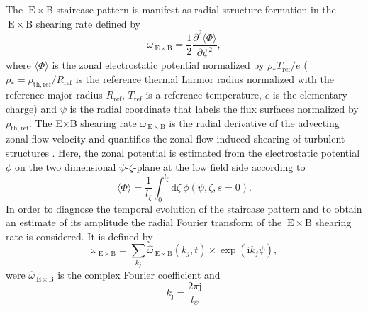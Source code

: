 \documentclass[aip, amsmath, amssymb, reprint, twocolumn]{revtex4-1}
\begin{document}
The ${\mathrm{\:E}\times\mathrm{B}}$ staircase pattern is manifest as radial structure formation in the ${\mathrm{\:E}\times\mathrm{B}}$ shearing rate defined by\cite{rath2016, doi:10.1063/1.3005380, rath2016, peeters2016}
\begin{equation}
	\omega_{\mathrm{\:E \times B}} = \frac{1}{2} \frac{\partial^2 \langle \Phi \rangle}{\partial \psi^2},
	\label{eq:shearingrate}
\end{equation}
where $\langle \Phi \rangle$ is the zonal electrostatic potential normalized by $\rho_\ast T_\mathrm{ref}/e$ ($\rho_\ast = \rho_\mathrm{th,ref}/R_\mathrm{ref}$ is the reference thermal Larmor radius normalized with the reference major radius $R_\mathrm{ref}$, $T_\mathrm{ref}$ is a reference temperature, $e$ is the elementary charge) and $\psi$ is the radial coordinate that labels the flux surfaces normalized by $\rho_\mathrm{th,ref}$.
The E$\times$B shearing rate $\omega_{\mathrm{\:E \times B}}$ is the radial derivative of the advecting zonal flow velocity \cite{doi:10.1063/1.871313, doi:10.1063/1.872847} and quantifies the zonal flow induced shearing of turbulent structures \cite{doi:10.1063/1.859529, doi:10.1063/1.871313, doi:10.1063/1.872367}. 
Here, the zonal potential is estimated from the electrostatic potential $\phi$ on the two dimensional $\psi$-$\zeta$-plane at the low field side according to
\begin{equation}
\langle \Phi \rangle = \frac{1}{l_\zeta} \int_0^{l_\zeta} \mathrm{d}\zeta ~ \phi(\psi,\zeta,s=0).
\end{equation}
In order to diagnose the temporal evolution of the staircase pattern and to obtain an estimate of its amplitude the radial Fourier transform of the ${\mathrm{\:E}\times\mathrm{B}}$ shearing rate is considered. 
It is defined by
\begin{equation}
	\omega_{\mathrm{\:E \times B}} = \sum_{k_j} \widehat \omega_{\mathrm{\:E \times B}}(k_j,t) \times \exp(\mathrm{i} k_j \psi),
	\label{eq:shearingrate_fourier}
\end{equation}
were $\widehat \omega_{\mathrm{\:E \times B}}$ is the complex Fourier coefficient and 
\begin{equation}
	k_\mathrm{j} = \frac{2\pi \mathrm{j}}{l_\psi}
\end{equation}
\end{document}
